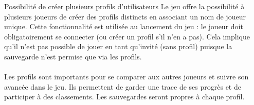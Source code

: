 {
    Possibilité de créer plusieurs profils d'utilisateurs
}
{
    Le jeu offre la possibilité à plusieurs joueurs de créer des profils distincts en associant un nom de joueur unique. Cette fonctionnalité est utilisée au lancement du jeu : le joueur doit obligatoirement se connecter (ou créer un profil s'il n'en a pas). Cela implique qu'il n'est pas possible de jouer en tant qu'invité (sans profil) puisque la sauvegarde n'est permise que via les profils.
    \\
    \\
    Les profils sont importants pour se comparer aux autres joueurs et suivre son avancée dans le jeu. Ils permettent de garder une trace de ses progrès et de participer à des classements.
    Les sauvegardes seront propres à chaque profil.
}